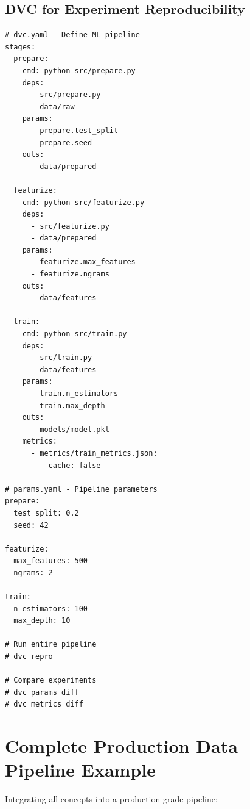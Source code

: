 \subsection{DVC for Experiment Reproducibility}

\begin{lstlisting}[style=python, caption=Reproducible Experiments with DVC]
# dvc.yaml - Define ML pipeline
stages:
  prepare:
    cmd: python src/prepare.py
    deps:
      - src/prepare.py
      - data/raw
    params:
      - prepare.test_split
      - prepare.seed
    outs:
      - data/prepared

  featurize:
    cmd: python src/featurize.py
    deps:
      - src/featurize.py
      - data/prepared
    params:
      - featurize.max_features
      - featurize.ngrams
    outs:
      - data/features

  train:
    cmd: python src/train.py
    deps:
      - src/train.py
      - data/features
    params:
      - train.n_estimators
      - train.max_depth
    outs:
      - models/model.pkl
    metrics:
      - metrics/train_metrics.json:
          cache: false

# params.yaml - Pipeline parameters
prepare:
  test_split: 0.2
  seed: 42

featurize:
  max_features: 500
  ngrams: 2

train:
  n_estimators: 100
  max_depth: 10

# Run entire pipeline
# dvc repro

# Compare experiments
# dvc params diff
# dvc metrics diff
\end{lstlisting}

\section{Complete Production Data Pipeline Example}

Integrating all concepts into a production-grade pipeline:

